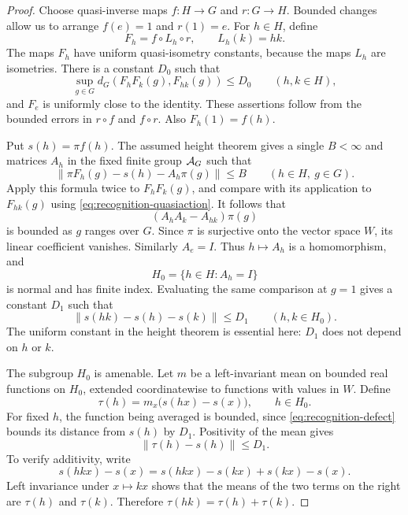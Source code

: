 \begin{proof}
Choose quasi-inverse maps $f:H\to G$ and $r:G\to H$.  Bounded changes
allow us to arrange $f(e)=1$ and $r(1)=e$.  For $h\in H$, define
\[
 F_h=f\circ L_h\circ r,
 \qquad L_h(k)=hk.
\]
The maps $F_h$ have uniform quasi-isometry constants, because the maps
$L_h$ are isometries.  There is a constant $D_0$ such that
\begin{equation}\label{eq:recognition-quasiaction}
 \sup_{g\in G}d_G(F_hF_k(g),F_{hk}(g))\leq D_0
 \qquad(h,k\in H),
\end{equation}
and $F_e$ is uniformly close to the identity.  These assertions follow
from the bounded errors in $r\circ f$ and $f\circ r$.  Also
$F_h(1)=f(h)$.

Put $s(h)=\pi f(h)$.  The assumed height theorem gives a single
$B<\infty$ and matrices $A_h$ in the fixed finite group $\mathcal A_G$
such that
\begin{equation}\label{eq:recognition-affine-action}
 \|\pi F_h(g)-s(h)-A_h\pi(g)\|\leq B
 \qquad(h\in H,\ g\in G).
\end{equation}
Apply this formula twice to $F_hF_k(g)$, and compare with its application
to $F_{hk}(g)$ using \eqref{eq:recognition-quasiaction}.  It follows
that
\[
 (A_hA_k-A_{hk})\pi(g)
\]
is bounded as $g$ ranges over $G$.  Since $\pi$ is surjective onto the
vector space $W$, its linear coefficient vanishes.  Similarly $A_e=I$.
Thus $h\mapsto A_h$ is a homomorphism, and
\[
 H_0=\{h\in H:A_h=I\}
\]
is normal and has finite index.  Evaluating the same comparison at
$g=1$ gives a constant $D_1$ such that
\begin{equation}\label{eq:recognition-defect}
 \|s(hk)-s(h)-s(k)\|\leq D_1\qquad(h,k\in H_0).
\end{equation}
The uniform constant in the height theorem is essential here: $D_1$
does not depend on $h$ or $k$.

The subgroup $H_0$ is amenable.  Let $m$ be a left-invariant mean on
bounded real functions on $H_0$, extended coordinatewise to functions
with values in $W$.  Define
\begin{equation}\label{eq:recognition-mean}
 \tau(h)=m_x\bigl(s(hx)-s(x)\bigr),\qquad h\in H_0.
\end{equation}
For fixed $h$, the function being averaged is bounded, since
\eqref{eq:recognition-defect} bounds its distance from $s(h)$ by $D_1$.
Positivity of the mean gives
\begin{equation}\label{eq:recognition-mean-error}
 \|\tau(h)-s(h)\|\leq D_1.
\end{equation}
To verify additivity, write
\[
 s(hkx)-s(x)=s(hkx)-s(kx)+s(kx)-s(x).
\]
Left invariance under $x\mapsto kx$ shows that the means of the two
terms on the right are $\tau(h)$ and $\tau(k)$.  Therefore
$\tau(hk)=\tau(h)+\tau(k)$.


\end{proof}
